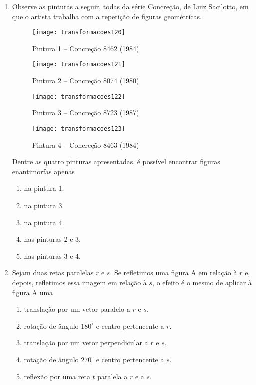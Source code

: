 \begin{enumerate}
\item Observe as pinturas a seguir, todas da série Concreção, de Luiz Sacilotto, em que o artista trabalha com a repetição de figuras geométricas. 


\begin{multicols}{2}
\begin{figure}[H]
\centering

\texttt{[image: transformacoes120]}
\caption{Pintura 1 – Concreção 8462 (1984)}

\end{figure}
\begin{figure}[H]
\centering

\texttt{[image: transformacoes121]}
\caption{Pintura 2 – Concreção 8074 (1980)}

\end{figure}
\begin{figure}[H]
\centering

\texttt{[image: transformacoes122]}
\caption{Pintura 3 – Concreção 8723 (1987)}

\end{figure}
\begin{figure}[H]
\centering

\texttt{[image: transformacoes123]}
\caption{Pintura 4 – Concreção 8463 (1984)}

\end{figure}
\end{multicols}

Dentre as quatro pinturas apresentadas, é possível encontrar figuras enantimorfas apenas 
\begin{enumerate}
\item na pintura 1.
\item na pintura 3.
\item na pintura 4. 
\item nas pinturas 2 e 3.
\item nas pinturas 3 e 4.
\end{enumerate}


\item Sejam duas retas paralelas $r$ e $s$. Se refletimos uma figura A em relação à $r$ e, depois, refletimos essa imagem em relação à $s$, o efeito é o mesmo de aplicar à figura A uma
\begin{enumerate}
\item translação por um vetor paralelo a $r$ e $s$. 
\item rotação de ângulo $180^{\circ}$ e centro pertencente a $r$.
\item translação por um vetor perpendicular a $r$ e $s$.
\item rotação de ângulo $270^{\circ}$ e centro pertencente a $s$.
\item reflexão por uma reta $t$ paralela a $r$ e a $s$.
\end{enumerate}


\end{enumerate}
